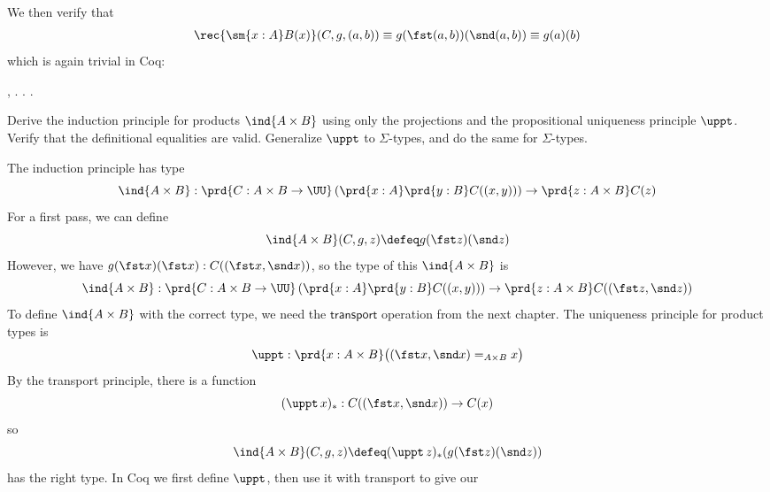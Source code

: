   \noindent
We then verify that
\begin{align*}
\rec{\sm{x:A}B(x)}(C, g, (a, b))
\equiv g(\fst (a, b))(\snd (a, b))
\equiv g(a)(b)
\end{align*}
which is again trivial in Coq: \begin{coqdoccode}
\coqdocemptyline
\coqdocindent{1.00em}
 \coqdockw{\ensuremath{\forall}}    ,    \coqdocnotation{(}\coqdocnotation{;} \coqdocnotation{)} \coqdocnotation{=}   . . .\coqdoceol
\coqdocemptyline
\coqdocemptyline
\end{coqdoccode}
Derive the induction principle for products $\ind{A \times B}$ using only the
projections and the propositional uniqueness principle $\uppt$.  Verify that
the definitional equalities are valid.  Generalize $\uppt$ to $\Sigma$-types,
and do the same for $\Sigma$-types. \begin{coqdoccode}
\coqdocemptyline
\end{coqdoccode}
\soln 
The induction principle has type
\[
\ind{A\times B} : \prd{C: A\times B \to \UU}\left(\prd{x:A}\prd{y:B}C((x,
y))\right) \to \prd{z:A\times B}C(z)
\]
For a first pass, we can define
\[
\ind{A\times B}(C, g, z)
\defeq
g(\fst z)(\snd z)
\]
However, we have $g(\fst x)(\fst x) : C((\fst x, \snd x))$, so the type of this
$\ind{A \times B}$ is
\[
\ind{A\times B} : \prd{C: A\times B \to \UU}\left(\prd{x:A}\prd{y:B}C((x,
y))\right) \to \prd{z:A\times B}C((\fst z, \snd z))
\]
To define $\ind{A \times B}$ with the correct type, we need the
$\mathsf{transport}$ operation from the next chapter.  The uniqueness principle
for product types is
\[
\uppt : \prd{x : A \times B} \big((\fst x, \snd x) =_{A \times B} x\big)
\]
By the transport principle, there is a function
\[
(\uppt\, x)_{*} : C((\fst x, \snd x)) \to C(x)
\]
so
\[
\ind{A \times B}(C, g, z)
\defeq
(\uppt\, z)_{*}(g(\fst z)(\snd z))
\]
has the right type.
In Coq we first define $\uppt$, then use it with transport to give our
